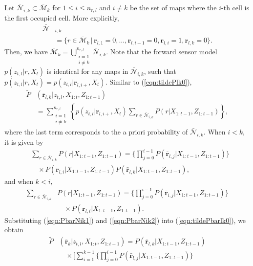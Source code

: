 \documentclass[letterpaper, 10pt, conference]{ieeeconf}
\newcommand{\braces}[1]{\ensuremath{\left\{ #1 \right\}}}
\newcommand{\refeqn}[1]{(\ref{eqn:#1})}
\begin{document}
\begin{appendix}
Let $\bar{\mathcal{N}}_{i,k}\subset \bar{\mathcal{M}}_k $ for $1\leq i\leq n_{r,l}$ and $i\neq k$ be the set of maps where the $i$-th cell is the first occupied cell. More explicitly, 
\begin{align*}
\bar{\mathcal{N}}&_{i,k}\nonumber\\&=\{r\in\bar{\mathcal{M}}_k\,|\, \mathbf{r}_{l,1}=0,\ldots,\mathbf{r}_{l,i-1}=0,
\mathbf{r}_{l,i}=1,\mathbf{r}_{l,k}=0\}.
\end{align*}
Then, we have $\bar{\mathcal{M}}_k=\bigcup_{\substack{i=1\\i\neq k}}^{n_{r,l}} \bar{\mathcal{N}}_{i,k}$. Note that the forward sensor model $p(z_{t,l}|r,X_t)$ is identical for any maps in $\bar{\mathcal{N}}_{i,k}$, such that $p(z_{t,l}|r,X_t)=p(z_{t,l}|\mathbf{r}_{l,i+},X_t)$. Similar to \refeqn{tildePlk0},
\begin{align}
\tilde P&(\bar{\mathbf{r}}_{l,k}|z_{t,l},X_{1:t},Z_{1:t-1})\nonumber\\
& = \sum_{\substack{i=1\\i\neq k}}^{n_{r,l}} \braces{p(z_{t,l}|\mathbf{r}_{l,i+},X_t) \sum_{r\in\bar{\mathcal{N}}_{i,k}} P(r|X_{1:t-1},Z_{1:t-1})},\label{eqn:tildePbarlk0}
\end{align}
where the last term corresponds to the a priori probability of $\bar{\mathcal{N}}_{i,k}$. When $i<k$, it is given by
\begin{align}
&\sum_{r\in\bar{\mathcal{N}}_{i,k}} P(r|X_{1:t-1},Z_{1:t-1}) = \bigg\{\prod_{j=0}^{i-1}P(\bar{\mathbf{r}}_{l,j}|X_{1:t-1},Z_{1:t-1})\bigg\}\nonumber\\
&\quad \times P({\mathbf{r}}_{l,i}|X_{1:t-1},Z_{1:t-1})P(\bar{\mathbf{r}}_{l,k}|X_{1:t-1},Z_{1:t-1}),\label{eqn:PbarNik1}
\end{align}
and when $k<i$,
\begin{align}
\sum_{r\in\bar{\mathcal{N}}_{i,k}} & P(r|X_{1:t-1},Z_{1:t-1}) = \bigg\{\prod_{j=0}^{i-1}P(\bar{\mathbf{r}}_{l,j}|X_{1:t-1},Z_{1:t-1})\bigg\}\nonumber\\
&\quad \times P({\mathbf{r}}_{l,i}|X_{1:t-1},Z_{1:t-1}).\label{eqn:PbarNik2}
\end{align}
Substituting \refeqn{PbarNik1} and \refeqn{PbarNik2} into \refeqn{tildePbarlk0}, we obtain
\begin{align}
\tilde P &(\bar{\mathbf{r}}_k|z_{t,l},X_{1:t},Z_{1:t-1})
=P(\bar{\mathbf{r}}_{l,k}|X_{1:t-1},Z_{1:t-1})\nonumber\\
&\quad\times \bigg[\sum_{i=1}^{k-1}\bigg\{\prod_{j=0}^{i-1}P(\bar{\mathbf{r}}_{l,j}|X_{1:t-1},Z_{1:t-1})\bigg\}\nonumber\\

\end{align}
\end{appendix}
\end{document}
